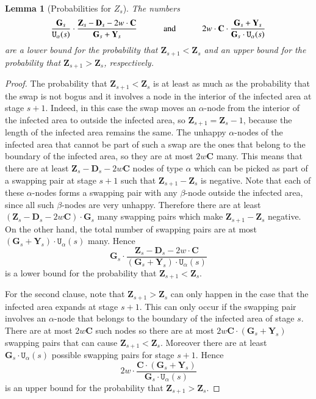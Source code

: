 \documentclass[11pt]{article}
\theoremstyle{plain}
\newtheorem{lem}[thm]{Lemma}
\numberwithin{equation}{subsection}
\newcommand{\ZZ}{\mathbf{Z}}
\newcommand{\DD}{\mathbf{D}}
\newcommand{\GG}{\mathbf{G}}
\newcommand{\YY}{\mathbf{Y}}
\newcommand{\CC}{\mathbf{C}}
\newcommand{\unhap}{\mathtt{U}}
\begin{document}
\begin{lem}[Probabilities for $Z_s$]\label{le:zs1lzsprob}
The numbers
\[
\textrm{$\frac{\GG_s}{\unhap_{\alpha}(s)}\cdot 
\frac{\ZZ_s-\DD_s-2w\cdot \CC}{\GG_s+\YY_s}$ 
\hspace{1cm}and\hspace{1cm}
$2w\cdot \CC\cdot\frac{\GG_s+\YY_s}{\GG_s\cdot \unhap_{\alpha}(s)}$}
\]
are a lower bound for the probability that 
$\ZZ_{s+1}<\ZZ_s$
and an upper bound for the probability that 
$\ZZ_{s+1}>\ZZ_s$, respectively.
\end{lem}
\begin{proof}
The probability that
$\ZZ_{s+1}<\ZZ_s$ is at least as much as the probability that the swap
is not bogus and it
involves a node in
the interior of the infected area 
at stage $s+1$.
Indeed, in this case
the swap moves an $\alpha$-node from the interior of the infected area 
to outside the infected area, so $\ZZ_{s+1}=\ZZ_s-1$, 
because the length of the infected area remains the same. 
The unhappy $\alpha$-nodes of the infected area that 
cannot be part of such a swap are the ones that belong to the
boundary of the infected area,
so they are at most $2w\CC$ many. 
This means that there are at least
$\ZZ_s-\DD_s-2w\CC$ nodes of type $\alpha$  
which can be picked as part of a
swapping pair at stage $s+1$ such that $\ZZ_{s+1}-\ZZ_s$ is negative.
Note that each of these $\alpha$-nodes forms a swapping pair with any
$\beta$-node outside the infected area, since all such $\beta$-nodes are very unhappy.  
Therefore there are
at least $(\ZZ_s-\DD_s-2w\CC)\cdot \GG_s$ many  
swapping pairs which make $\ZZ_{s+1}-\ZZ_s$ negative. 
On the other hand, the total number of swapping pairs
are at most 
$(\GG_s+\YY_s)\cdot \unhap_{\alpha}(s)$ many. 
Hence 
\[
\GG_s\cdot 
\frac{\ZZ_s-\DD_s-2w\cdot \CC}{(\GG_s+\YY_s)\cdot \unhap_{\alpha}(s)}
\]
is a lower bound for the probability that $\ZZ_{s+1}<\ZZ_s$. 

For the second clause,
note that
$\ZZ_{s+1}>\ZZ_s$ can only happen in the 
case that the infected area expands at stage $s+1$.
This  can only occur
if the swapping pair involves an $\alpha$-node 
that belongs to the boundary of the infected area of stage $s$. 
There are at most 
$2w\CC$ such nodes so there are at most 
$2w\CC\cdot (\GG_s+\YY_s)$ 
swapping pairs that
can cause $\ZZ_{s+1}<\ZZ_s$.
Moreover there are at least $\GG_s\cdot \unhap_{\alpha}(s)$ possible swapping pairs
for stage $s+1$.
Hence 
\[
2w\cdot \frac{\CC\cdot (\GG_s+\YY_s)}{\GG_s\cdot \unhap_{\alpha}(s)}
\]
is an upper bound for the probability that $\ZZ_{s+1}>\ZZ_s$.
\end{proof}
\end{document}
